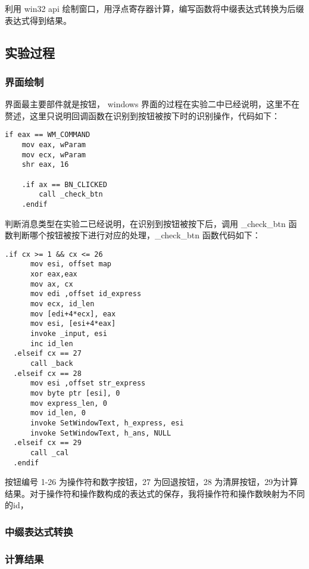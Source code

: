\documentclass[proposal-report]{bitart}
\begin{document}
利用 win32 api 绘制窗口，用浮点寄存器计算，编写函数将中缀表达式转换为后缀表达式得到结果。

\subsection{实验过程}

\subsubsection{界面绘制}

界面最主要部件就是按钮， windows 界面的过程在实验二中已经说明，这里不在赘述，这里只说明回调函数在识别到按钮被按下时的识别操作，代码如下：

\begin{lstlisting}[language={[x86masm]Assembler}]
  if eax == WM_COMMAND
    mov eax, wParam
    mov ecx, wParam
    shr eax, 16

    .if ax == BN_CLICKED
        call _check_btn
    .endif
\end{lstlisting}

判断消息类型在实验二已经说明，在识别到按钮被按下后，调用 \_check\_btn 函数判断哪个按钮被按下进行对应的处理，\_check\_btn 函数代码如下：

\begin{lstlisting}[language={[x86masm]Assembler}]
  .if cx >= 1 && cx <= 26
      mov esi, offset map
      xor eax,eax
      mov ax, cx
      mov edi ,offset id_express
      mov ecx, id_len
      mov [edi+4*ecx], eax
      mov esi, [esi+4*eax]
      invoke _input, esi
      inc id_len
  .elseif cx == 27
      call _back
  .elseif cx == 28
      mov esi ,offset str_express
      mov byte ptr [esi], 0
      mov express_len, 0
      mov id_len, 0
      invoke SetWindowText, h_express, esi
      invoke SetWindowText, h_ans, NULL
  .elseif cx == 29
      call _cal
  .endif
\end{lstlisting}

按钮编号 1-26 为操作符和数字按钮，27 为回退按钮，28 为清屏按钮，29为计算结果。对于操作符和操作数构成的表达式的保存，我将操作符和操作数映射为不同的id，


\subsubsection{中缀表达式转换}

\subsubsection{计算结果}
\end{document}
